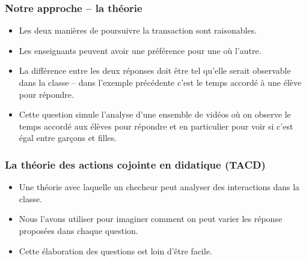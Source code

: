 \documentclass{beamer}
\begin{document}
\begin{frame}
\frametitle{Notre approche -- la théorie}
\begin{itemize}
\item Les deux manières de poursuivre la transaction sont raisonables.
\item Les enseignants peuvent avoir une préférence pour une où l'autre.
\item La différence entre les deux réponses doit être tel qu'elle serait
  observable dans la classe -- dans l'exemple précédente c'est le temps
  accordé à une élève pour répondre.
\item Cette question simule l'analyse d'une ensemble de vidéos où on
  observe le temps accordé aux élèves pour répondre et en particulier
  pour voir si c'est égal entre garçons et filles.
\end{itemize}
\end{frame}

\begin{frame}
  \frametitle{La théorie des actions cojointe en didatique (TACD)}
  \begin{itemize}
    \item Une théorie avec laquelle un checheur peut analyser des interactions
      dans la classe.
    \item Nous l'avons utiliser pour imaginer comment on peut varier
      les réponse proposées dans chaque question.
      \item Cette élaboration des questions est loin d'être facile.
    \end{itemize}
\end{frame}
\end{document}
